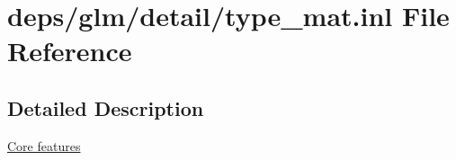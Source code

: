 \hypertarget{type__mat_8inl}{}\section{deps/glm/detail/type\+\_\+mat.inl File Reference}
\label{type__mat_8inl}


\subsection{Detailed Description}
\hyperlink{group__core}{Core features} 